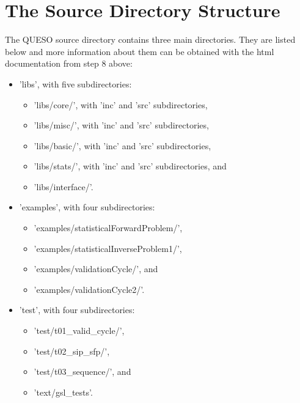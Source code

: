 

\section{The Source Directory Structure} \label{sc-source-dir-structure}

The QUESO source directory contains three main directories. They are listed below and more
information about them can be obtained with the html documentation from step 8 above:
\begin{itemize}
\item {'libs', with five subdirectories:
\begin{itemize}
\item 'libs/core/', with 'inc' and 'src' subdirectories,
\item 'libs/misc/', with 'inc' and 'src' subdirectories,
\item 'libs/basic/', with 'inc' and 'src' subdirectories,
\item 'libs/stats/', with 'inc' and 'src' subdirectories, and
\item 'libs/interface/'.
\end{itemize}
}
\item {'examples', with four subdirectories:
\begin{itemize}
\item 'examples/statisticalForwardProblem/',
\item 'examples/statisticalInverseProblem1/',
\item 'examples/validationCycle/', and
\item 'examples/validationCycle2/'.
\end{itemize}
}
\item {'test', with four subdirectories:
\begin{itemize}
\item 'test/t01\_valid\_cycle/',
\item 'test/t02\_sip\_sfp/',
\item 'test/t03\_sequence/', and
\item 'text/gsl\_tests'.
\end{itemize}
}
\end{itemize}

